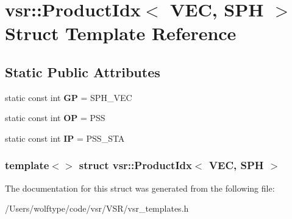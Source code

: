 \hypertarget{structvsr_1_1_product_idx_3_01_v_e_c_00_01_s_p_h_01_4}{\section{vsr\-:\-:Product\-Idx$<$ V\-E\-C, S\-P\-H $>$ Struct Template Reference}
\label{structvsr_1_1_product_idx_3_01_v_e_c_00_01_s_p_h_01_4}
}
\subsection*{Static Public Attributes}
\begin{DoxyCompactItemize}
\item 
\hypertarget{structvsr_1_1_product_idx_3_01_v_e_c_00_01_s_p_h_01_4_ad076bbb6769cc37c32a376eb3e3c1de1}{static const int {\bfseries G\-P} = S\-P\-H\-\_\-\-V\-E\-C}\label{structvsr_1_1_product_idx_3_01_v_e_c_00_01_s_p_h_01_4_ad076bbb6769cc37c32a376eb3e3c1de1}

\item 
\hypertarget{structvsr_1_1_product_idx_3_01_v_e_c_00_01_s_p_h_01_4_adb06332ac58b7776c1388c7669f506f5}{static const int {\bfseries O\-P} = P\-S\-S}\label{structvsr_1_1_product_idx_3_01_v_e_c_00_01_s_p_h_01_4_adb06332ac58b7776c1388c7669f506f5}

\item 
\hypertarget{structvsr_1_1_product_idx_3_01_v_e_c_00_01_s_p_h_01_4_adb14c7bd2642612c450dc30878a23bf4}{static const int {\bfseries I\-P} = P\-S\-S\-\_\-\-S\-T\-A}\label{structvsr_1_1_product_idx_3_01_v_e_c_00_01_s_p_h_01_4_adb14c7bd2642612c450dc30878a23bf4}

\end{DoxyCompactItemize}
\subsubsection*{template$<$$>$ struct vsr\-::\-Product\-Idx$<$ V\-E\-C, S\-P\-H $>$}



The documentation for this struct was generated from the following file\-:\begin{DoxyCompactItemize}
\item 
/\-Users/wolftype/code/vsr/\-V\-S\-R/vsr\-\_\-templates.\-h\end{DoxyCompactItemize}
